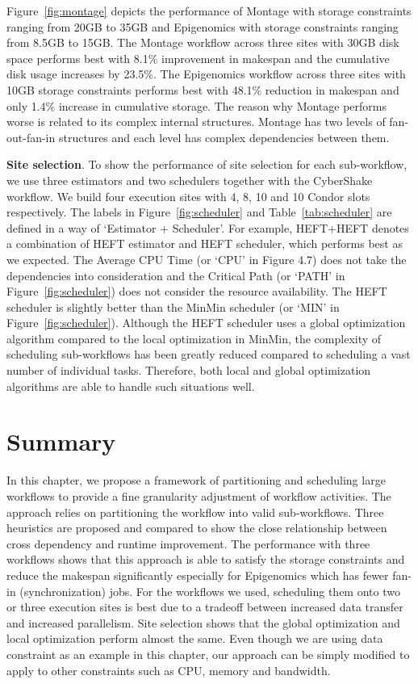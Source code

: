 Figure~\ref{fig:montage} depicts the performance of Montage with storage constraints ranging from 20GB to 35GB and Epigenomics with storage constraints ranging from 8.5GB to 15GB. The Montage workflow across three sites with 30GB disk space performs best with 8.1\% improvement in makespan and the cumulative disk usage increases by 23.5\%. The Epigenomics workflow across three sites with 10GB storage constraints performs best with 48.1\% reduction in makespan and only 1.4\% increase in cumulative storage. The reason why Montage performs worse is related to its complex internal structures. Montage has two levels of fan-out-fan-in structures and each level has complex dependencies between them.

\textbf{Site selection}. To show the performance of site selection for each sub-workflow, we use three estimators and two schedulers  together with the CyberShake workflow. We build four execution sites with 4, 8, 10 and 10 Condor slots respectively. The labels in Figure~\ref{fig:scheduler} and Table~\ref{tab:scheduler} are defined in a way of ‘Estimator + Scheduler’. For example, HEFT+HEFT denotes a combination of HEFT estimator and HEFT scheduler, which performs best as we expected. The Average CPU Time (or ‘CPU’ in Figure 4.7) does not take the dependencies into consideration and the Critical Path (or ‘PATH’ in Figure~\ref{fig:scheduler}) does not consider the resource availability. The HEFT scheduler is slightly better than the MinMin scheduler (or ‘MIN’ in Figure~\ref{fig:scheduler}). Although the HEFT scheduler uses a global optimization algorithm compared to the local optimization in MinMin, the complexity of scheduling sub-workflows has been greatly reduced compared to scheduling a vast number of individual tasks. Therefore, both local and global optimization algorithms are able to handle such situations well.


\section{Summary}

In this chapter, we propose a framework of partitioning and scheduling large workflows to provide a fine granularity adjustment of workflow activities. The approach relies on partitioning the workflow into valid sub-workflows. Three heuristics are proposed and compared to show the close relationship between cross dependency and runtime improvement. The performance with three workflows shows that this approach is able to satisfy the storage constraints and reduce the makespan significantly especially for Epigenomics which has fewer fan-in (synchronization) jobs. For the workflows we used, scheduling them onto two or three execution sites is best due to a tradeoff between increased data transfer and increased parallelism. Site selection shows that the global optimization and local optimization perform almost the same.  Even though we are using data constraint as an example in this chapter, our approach can be simply modified to apply to other constraints such as CPU, memory and bandwidth. 

